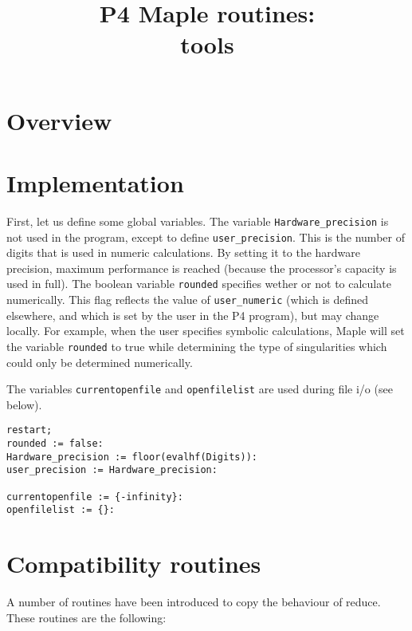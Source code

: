 \documentclass[a4paper,10pt]{article}
\title{P4 Maple routines:\\tools}
\author{}
\date{}
\begin{document}
\maketitle

\section{Overview}

\section{Implementation}

First, let us define some global variables.  The variable \verb+Hardware_precision+ is not
used in the program, except to define \verb+user_precision+.  This is the number of digits
that is used in numeric calculations.  By setting it to the hardware precision, maximum
performance is reached (because the processor's capacity is used in full).  The boolean
variable \verb+rounded+ specifies wether or not to calculate numerically.  This flag reflects
the value of \verb+user_numeric+ (which is defined elsewhere, and which is set by the user
in the P4 program), but may change locally.  For example, when the user specifies symbolic
calculations, Maple will set the variable \verb+rounded+ to true while determining the type
of singularities which could only be determined numerically.

The variables \verb+currentopenfile+ and \verb+openfilelist+ are used during file i/o (see below).

\begin{lstlisting}[name=tools]
restart;
rounded := false:
Hardware_precision := floor(evalhf(Digits)):
user_precision := Hardware_precision:

currentopenfile := {-infinity}:
openfilelist := {}:
\end{lstlisting}

\section{Compatibility routines}

A number of routines have been introduced to copy the behaviour of reduce.  These routines
are the following:
\end{document}
